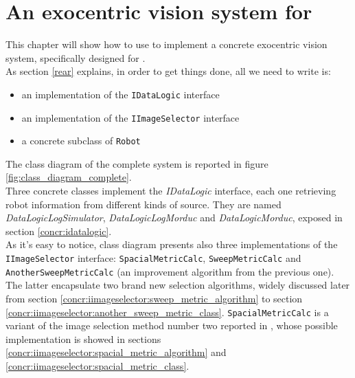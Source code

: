 \setcounter{figure}{0}
\setcounter{table}{0}
\setcounter{lstlisting}{0}

\chapter{An exocentric vision system for \morduc{}}
\label{concr}
\minitoc

This chapter will show how to use \framework{} to implement a 
concrete exocentric vision system, specifically designed for 
\morduc{}.
\\
As section \ref{rear} explains, in order to get things 
done, all we need to write is:

\begin{itemize}
\item an implementation of the \texttt{IDataLogic} interface
\item an implementation of the \texttt{IImageSelector} interface
\item a concrete subclass of \texttt{Robot}
\end{itemize}

The class diagram of the complete system is reported in figure
\ref{fig:class_diagram_complete}. 
\\
Three concrete classes implement the \textit{IDataLogic} interface,
each one retrieving robot information from different kinds of source.
They are named \textit{DataLogicLogSimulator}, \textit{DataLogicLogMorduc}
and \textit{DataLogicMorduc}, exposed in section \ref{concr:idatalogic}.
\\
As it's easy to notice, class diagram presents also three implementations 
of the \texttt{IImageSelector} interface: \texttt{SpacialMetricCalc},
\texttt{SweepMetricCalc} and \texttt{AnotherSweepMetricCalc}
(an improvement algorithm from the previous one).
The latter encapsulate two brand new selection algorithms,
widely discussed later from section
\ref{concr:iimageselector:sweep_metric_algorithm} to section
\ref{concr:iimageselector:another_sweep_metric_class}.
\texttt{SpacialMetricCalc} is a variant 
of the image selection method number two reported in \cite{sugimoto}, 
whose possible implementation is showed in sections
\ref{concr:iimageselector:spacial_metric_algorithm} and
\ref{concr:iimageselector:spacial_metric_class}.

